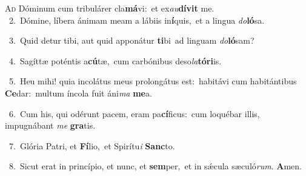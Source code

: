 \lettrine{\initial\textcolor{\initialcolor}{A}}{d} Dóminum cum tribulárer cla\-\textbf{má}\-vi:~\star et ex\-\textit{au}\-\textbf{dí}\textbf{vit} me.\\
{\numbfont\textcolor{\numbcolor}{~2.}}~Dómine, líbera ánimam meam a lábiis in\-\textbf{í}\-quis,~\star et a lingua \textit{do}\-\textbf{ló}sa.\par
{\numbfont\textcolor{\numbcolor}{~3.}}~Quid detur tibi, aut quid apponátur \textbf{ti}\-bi~\star ad linguam \textit{do}\-\textbf{ló}sam?\par
{\numbfont\textcolor{\numbcolor}{~4.}}~Sagíttæ poténtis a\-\textbf{cú}\-tæ,~\star cum carbónibus deso\-\textit{la}\-\textbf{tó}\textbf{ri}is.\par
{\numbfont\textcolor{\numbcolor}{~5.}}~Heu mihi! quia incolátus meus prolongátus est:~\dagger habitávi cum habitántibus \textbf{Ce}\-dar:~\star multum íncola fuit áni\textit{ma} \textbf{me}\-a.\par
{\numbfont\textcolor{\numbcolor}{~6.}}~Cum his, qui odérunt pacem, eram pa\-\textbf{cí}\-ficus:~\star cum loquébar illis, impugnábant \textit{me} \textbf{gra}\-tis.\par
{\numbfont\textcolor{\numbcolor}{~7.}}~Glória Patri, et \textbf{Fí}\-lio,~\star et Spirítu\textit{i} \textbf{Sanc}\-to.\par
{\numbfont\textcolor{\numbcolor}{~8.}}~Sicut erat in princípio, et nunc, et \textbf{sem}\-per,~\star et in sǽcula sæculó\-\textit{rum}\-. \textbf{A}\-men.\par
